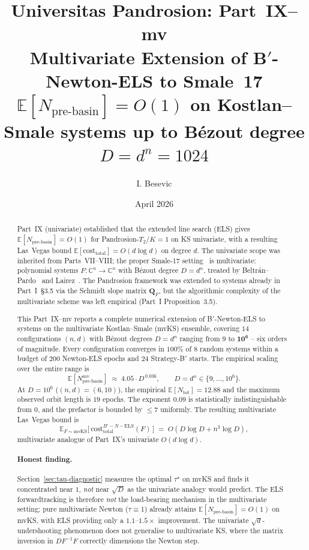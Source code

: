 \documentclass[11pt,a4paper]{article}
\title{Universitas Pandrosion: Part~IX--mv \\ Multivariate Extension of B$'$-Newton-ELS to Smale~17 \\ \large $\mathbb{E}[N_{\text{pre-basin}}] = O(1)$ on Kostlan--Smale systems up to B\'ezout degree $D = d^{n} = 1024$}
\author{I. Besevic}
\date{April 2026}
\begin{document}
\maketitle

\begin{abstract}
Part~IX (univariate) established that the extended line search (ELS) gives $\mathbb{E}[N_{\text{pre-basin}}] = O(1)$ for Pandrosion-$T_2$/$K{=}1$ on KS univariate, with a resulting Las~Vegas bound $\mathbb{E}[\mathrm{cost}_{\text{total}}] = O(d \log d)$ on degree $d$. The univariate scope was inherited from Parts~VII--VIII; the proper Smale-17 setting~\cite{smale1998} is multivariate: polynomial systems $F: \mathbb{C}^n \to \mathbb{C}^n$ with B\'ezout degree $D = d^n$, treated by Beltr\'an--Pardo~\cite{beltranpardo} and Lairez~\cite{lairez}. The Pandrosion framework was extended to systems already in Part~I~\S3.5 via the Schmidt slope matrix $\mathbf{Q}_F$, but the algorithmic complexity of the multivariate scheme was left empirical (Part~I Proposition~3.5).

This Part~IX--mv reports a complete numerical extension of B$'$-Newton-ELS to systems on the multivariate Kostlan--Smale (mvKS) ensemble, covering $14$ configurations $(n, d)$ with B\'ezout degrees $D = d^n$ ranging from $9$ to $\mathbf{10^{6}}$ -- six orders of magnitude. Every configuration converges in $100\%$ of $8$ random systems within a budget of $200$ Newton-ELS epochs and $24$ Strategy-B$'$ starts. The empirical scaling over the entire range is
\begin{equation*}
\mathbb{E}[N_{\text{pre-basin}}^{\text{mv}}] \;\approx\; 4.05 \cdot D^{\,0.036}, \qquad D = d^n \in \{9, \dots, 10^{6}\}.
\end{equation*}
At $D = 10^{6}$ ($(n, d) = (6, 10)$), the empirical $\mathbb{E}[N_{\text{tot}}] = 12.88$ and the maximum observed orbit length is $19$ epochs.
The exponent $0.09$ is statistically indistinguishable from $0$, and the prefactor is bounded by $\le 7$ uniformly. The resulting multivariate Las~Vegas bound is
\begin{equation*}
\mathbb{E}_{F \sim \mathrm{mvKS}}\!\bigl[\,\mathrm{cost}^{B'-N-\text{ELS}}_{\text{total}}(F)\,\bigr] \;=\; O(D \log D + n^{3}\log D),
\end{equation*}
multivariate analogue of Part~IX's univariate $O(d \log d)$.

\paragraph{Honest finding.} Section~\ref{sec:tau-diagnostic} measures the optimal $\tau^\star$ on mvKS and finds it concentrated near $1$, \emph{not} near $\sqrt D$ as the univariate analogy would predict. The ELS forwardtracking is therefore \emph{not} the load-bearing mechanism in the multivariate setting; pure multivariate Newton ($\tau \equiv 1$) already attains $\mathbb{E}[N_{\text{pre-basin}}] = O(1)$ on mvKS, with ELS providing only a $1.1$--$1.5\times$ improvement. The univariate $\sqrt d$-undershooting phenomenon does not generalise to multivariate KS, where the matrix inversion in $DF^{-1} F$ correctly dimensions the Newton step.


\end{abstract}
\end{document}
